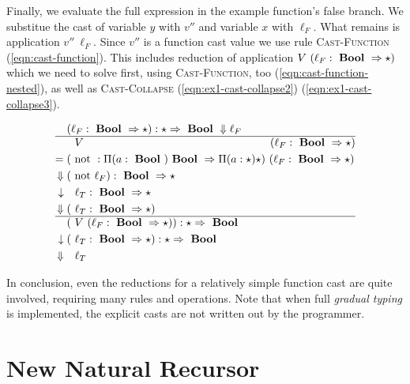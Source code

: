 Finally, we evaluate the full expression in the example function's false branch. We substitue the cast of variable $y$ with $v''$ and variable $x$ with $\ell_F$. What remains is application $v''~\ell_F$. Since $v''$ is a function cast value we use rule \textsc{Cast-Function} (\ref{eqn:cast-function}). This includes reduction of application $V~(\ell_F : \text{ \textbf{Bool} } \Rightarrow \star)$ which we need to solve first, using \textsc{Cast-Function}, too (\ref{eqn:cast-function-nested}), as well as \textsc{Cast-Collapse} (\ref{eqn:ex1-cast-collapse2}) (\ref{eqn:ex1-cast-collapse3}).

\begin{align}
(&\ell_F : \Bool \Rightarrow \star) : \star \Rightarrow \Bool \Downarrow \ell_F \label{eqn:ex1-cast-collapse2} \\ \hline
&~V~ \hspace{16.6em} (\ell_F : \Bool \Rightarrow \star) \\
= ( &\notf : \Pi(a:\Bool) \Bool \Rightarrow \Pi(a:\star) \star)~(\ell_F : \Bool \Rightarrow \star) \\
\Downarrow ( &\notf \ell_F ) : \Bool \Rightarrow \star \\
\downarrow ~~&~\ell_T : \Bool \Rightarrow \star \label{eqn:cast-function-nested} \\
\Downarrow (&~\ell_T : \Bool \Rightarrow \star) \\ \hline
( & ~V~(\ell_F : \Bool \Rightarrow \star)) : \star \Rightarrow \Bool \\
\downarrow (&~\ell_T : \Bool \Rightarrow \star) : \star \Rightarrow \Bool \label{eqn:cast-function} \\
\Downarrow ~~ & ~\ell_T \label{eqn:ex1-cast-collapse3}
\end{align}

In conclusion, even the reductions for a relatively simple function cast are quite involved, requiring many rules and operations. Note that when full \emph{gradual typing} is implemented, the explicit casts are not written out by the programmer.

\section{New Natural Recursor}

